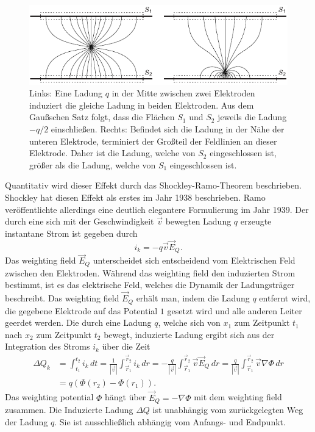 \begin{figure}[!b]
\begin{center}
\includegraphics[scale=1.25]{./fig/RamoQual.pdf}
\end{center}
\vspace{-0.5cm}
\caption{Links: Eine Ladung $q$ in der Mitte zwischen zwei Elektroden induziert die gleiche Ladung in beiden Elektroden.
Aus dem Gaußschen Satz folgt, dass die Flächen $S_1$ und $S_2$ jeweils die Ladung $-q/2$ einschließen.
Rechts: Befindet sich die Ladung in der Nähe der unteren Elektrode, terminiert der Großteil der Feldlinien an dieser Elektrode.
Daher ist die Ladung, welche von $S_2$ eingeschlossen ist, größer als die Ladung, welche von $S_1$ eingeschlossen ist. \cite{Editors}}
\label{fig:RamoQual}
\end{figure}

Quantitativ wird dieser Effekt durch das Shockley-Ramo-Theorem beschrieben.
Shockley hat diesen Effekt als erstes im Jahr 1938 beschrieben.
Ramo veröffentlichte allerdings eine deutlich elegantere Formulierung im Jahr 1939.
Der durch eine sich mit der Geschwindigkeit $\vec{v}$ bewegten Ladung $q$ erzeugte instantane Strom ist gegeben durch
\begin{equation}
i_k = -q\vec{v}\vec{E}_Q.
\label{eq:RamoCurrent}
\end{equation}
Das weighting field $\vec{E}_Q$ unterscheidet sich entscheidend vom Elektrischen Feld zwischen den Elektroden.
Während das weighting field den induzierten Strom bestimmt, ist es das elektrische Feld, welches die Dynamik der Ladungsträger beschreibt.
Das weighting field $\vec{E}_Q$ erhält man, indem die Ladung $q$ entfernt wird, die gegebene Elektrode auf das Potential $1$ gesetzt wird und alle anderen Leiter geerdet werden.\cite{Ramo1939}
Die durch eine Ladung $q$, welche sich von $x_1$ zum Zeitpunkt $t_1$ nach $x_2$ zum Zeitpunkt $t_2$ bewegt, induzierte Ladung ergibt sich aus der Integration des Stroms $i_k$ über die Zeit
\begin{align}
\Delta Q_k &= \int_{t_1}^{t_2}i_k \,dt = \frac{1}{|\vec{v}|} \int_{\vec{r}_1}^{\vec{r}_2}i_k \,dr = -\frac{q}{|\vec{v}|} \int_{\vec{r}_1}^{\vec{r}_2}\vec{v}\vec{E}_Q \,dr = \frac{q}{|\vec{v}|} \int_{\vec{r}_1}^{\vec{r}_2}\vec{v}\nabla\Phi \,dr \nonumber \\
&= q\left(\Phi(r_2) - \Phi(r_1)\right).
\label{eq:RamoCharge}
\end{align}
Das weighting potential $\Phi$ hängt über $\vec{E}_Q = -\nabla\Phi$ mit dem weighting field zusammen.
Die Induzierte Ladung $\Delta Q$ ist unabhängig vom zurückgelegten Weg der Ladung $q$.
Sie ist ausschließlich abhängig vom Anfangs- und Endpunkt.

